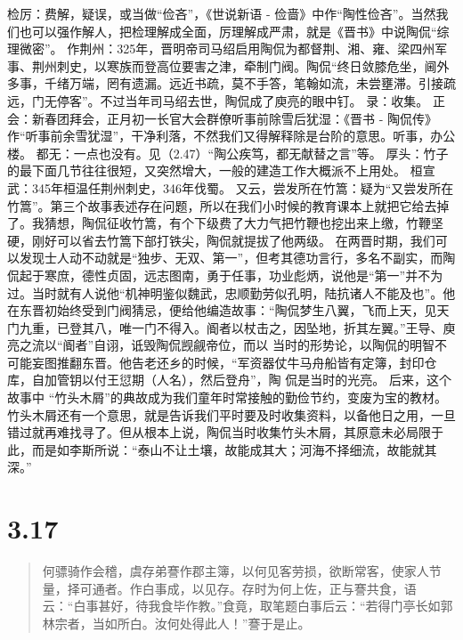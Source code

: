 \documentclass[]{book}
\begin{document}
检厉：费解，疑误，或当做``俭吝''，《世说新语 -
俭啬》中作``陶性俭吝''。当然我们也可以强作解人，把检理解成全面，厉理解成严肃，就是《晋书》中说陶侃``综理微密''。
作荆州：325年，晋明帝司马绍启用陶侃为都督荆、湘、雍、梁四州军事、荆州刺史，以寒族而登高位要害之津，牵制门阀。陶侃``终日敛膝危坐，阃外多事，千绪万端，罔有遗漏。远近书疏，莫不手答，笔翰如流，未尝壅滞。引接疏远，门无停客''。不过当年司马绍去世，陶侃成了庾亮的眼中钉。
录：收集。
正会：新春团拜会，正月初一长官大会群僚听事前除雪后犹湿：《晋书 -
陶侃传》作``听事前余雪犹湿''，干净利落，不然我们又得解释除是台阶的意思。听事，办公楼。
都无：一点也没有。见（2.47）``陶公疾笃，都无献替之言''等。
厚头：竹子的最下面几节往往很短，又突然增大，一般的建造工作大概派不上用处。
桓宣武：345年桓温任荆州刺史，346年伐蜀。
又云，尝发所在竹篙：疑为``又尝发所在竹篙''。第三个故事表述存在问题，所以在我们小时候的教育课本上就把它给去掉了。我猜想，陶侃征收竹篙，有个下级费了大力气把竹鞭也挖出来上缴，竹鞭坚硬，刚好可以省去竹篙下部打铁尖，陶侃就提拔了他两级。
在两晋时期，我们可以发现士人动不动就是``独步、无双、第一''，但考其德功言行，多名不副实，而陶侃起于寒庶，德性贞固，远志图南，勇于任事，功业彪炳，说他是``第一''并不为过。当时就有人说他``机神明鉴似魏武，忠顺勤劳似孔明，陆抗诸人不能及也''。他在东晋初始终受到门阀猜忌，便给他编造故事：``陶侃梦生八翼，飞而上天，见天门九重，已登其八，唯一门不得入。阍者以杖击之，因坠地，折其左翼。''王导、庾亮之流以``阍者''自诩，诋毁陶侃觊觎帝位，而以
当时的形势论，以陶侃的明智不可能妄图推翻东晋。他告老还乡的时候，``军资器仗牛马舟船皆有定簿，封印仓库，自加管钥以付王愆期（人名），然后登舟''，陶
侃是当时的光亮。 后来，这个故事中
``竹头木屑''的典故成为我们童年时常接触的勤俭节约，变废为宝的教材。竹头木屑还有一个意思，就是告诉我们平时要及时收集资料，以备他日之用，一旦错过就再难找寻了。但从根本上说，陶侃当时收集竹头木屑，其原意未必局限于此，而是如李斯所说：``泰山不让土壤，故能成其大；河海不择细流，故能就其深。''

\section{3.17}\label{section-171}

\begin{quote}
何骠骑作会稽，虞存弟謇作郡主簿，以何见客劳损，欲断常客，使家人节量，择可通者。作白事成，以见存。存时为何上佐，正与謇共食，语云：``白事甚好，待我食毕作教。''食竟，取笔题白事后云：``若得门亭长如郭林宗者，当如所白。汝何处得此人！''謇于是止。
\end{quote}
\end{document}
